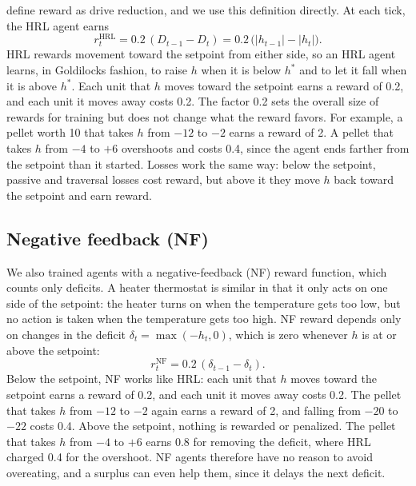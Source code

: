 \documentclass[12pt,fleqn]{article}
\begin{document}
\citet{keramati_homeostatic_2014} define reward as drive reduction, and we use this definition directly. At each tick, the HRL agent earns
\begin{equation}\label{eq:reward}
  r^{\mathrm{HRL}}_t=0.2\,(D_{t-1}-D_t)=0.2\,\bigl(|h_{t-1}|-|h_t|\bigr).
\end{equation}
HRL rewards movement toward the setpoint from either side, so an HRL agent learns, in Goldilocks fashion, to raise $h$ when it is below \(h^*\) and to let it fall when it is above \(h^*\). Each unit that $h$ moves toward the setpoint earns a reward of 0.2, and each unit it moves away costs 0.2. The factor 0.2 sets the overall size of rewards for training but does not change what the reward favors. For example, a pellet worth 10 that takes $h$ from $-12$ to $-2$ earns a reward of 2. A pellet that takes $h$ from $-4$ to $+6$ overshoots and costs 0.4, since the agent ends farther from the setpoint than it started. Losses work the same way: below the setpoint, passive and traversal losses cost reward, but above it they move $h$ back toward the setpoint and earn reward.

\subsection{Negative feedback (NF)}\label{sec:nf}

We also trained agents with a negative-feedback (NF) reward function, which counts only deficits. A heater thermostat is similar in that it only acts on one side of the setpoint: the heater turns on when the temperature gets too low, but no action is taken when the temperature gets too high. NF reward depends only on changes in the deficit $\delta_t=\max(-h_t,0)$, which is zero whenever $h$ is at or above the setpoint:
\begin{equation}\label{eq:reward-nf}
  r^{\mathrm{NF}}_t=0.2\,(\delta_{t-1}-\delta_t).
\end{equation}
Below the setpoint, NF works like HRL: each unit that $h$ moves toward the setpoint earns a reward of 0.2, and each unit it moves away costs 0.2. The pellet that takes $h$ from $-12$ to $-2$ again earns a reward of 2, and falling from $-20$ to $-22$ costs 0.4. Above the setpoint, nothing is rewarded or penalized. The pellet that takes $h$ from $-4$ to $+6$ earns 0.8 for removing the deficit, where HRL charged 0.4 for the overshoot. NF agents therefore have no reason to avoid overeating, and a surplus can even help them, since it delays the next deficit.
\end{document}

